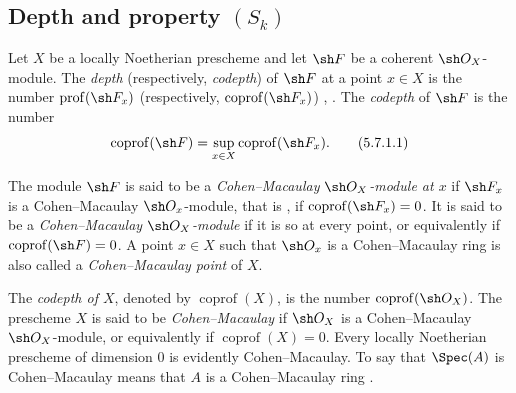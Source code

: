 \subsection{Depth and property \texorpdfstring{$(S_k)$}{(Sk)}}
\label{subsection:IV.5.7}


\begin{definition}[5.7.1]
\label{IV.5.7.1}
Let $X$ be a locally Noetherian prescheme and let $\sh F$ be a
coherent $\sh O_X$-module.  The \emph{depth} (respectively,
\emph{codepth}) of $\sh F$ at a point $x\in X$ is the number
$\operatorname{prof}(\sh F_x)$ (respectively,
$\operatorname{coprof}(\sh F_x)$)
, .  The \emph{codepth} of
$\sh F$ is the number
\begin{equation}
\operatorname{coprof}(\sh F)
 =\sup_{x\in X}\operatorname{coprof}(\sh F_x).
\tag{5.7.1.1}\label{IV.5.7.1.1}
\end{equation}

The module $\sh F$ is said to be a
\emph{Cohen--Macaulay $\sh O_X$-module at $x$} if $\sh F_x$ is a
Cohen--Macaulay $\sh O_x$-module, that is
, if
$\operatorname{coprof}(\sh F_x)=0$.  It is said to be a
\emph{Cohen--Macaulay $\sh O_X$-module} if it is so at every point,
or equivalently if $\operatorname{coprof}(\sh F)=0$.  A point
$x\in X$ such that $\sh O_x$ is a Cohen--Macaulay ring is also
called a \emph{Cohen--Macaulay point} of $X$.

The \emph{codepth of $X$}, denoted by $\operatorname{coprof}(X)$,
is the number $\operatorname{coprof}(\sh O_X)$.  The prescheme $X$
is said to be \emph{Cohen--Macaulay} if $\sh O_X$ is a
Cohen--Macaulay $\sh O_X$-module, or equivalently if
$\operatorname{coprof}(X)=0$.  Every locally Noetherian prescheme of
dimension $0$ is evidently Cohen--Macaulay.  To say that
$\Spec(A)$ is Cohen--Macaulay means that $A$ is a Cohen--Macaulay
ring .
\end{definition}

